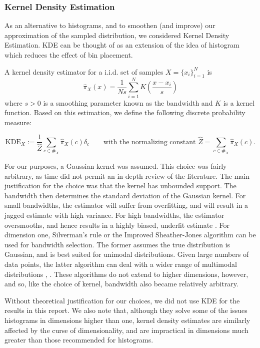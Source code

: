 \subsubsection{Kernel Density Estimation}
As an alternative to histograms, and to smoothen (and improve) our approximation of the sampled distribution, we considered Kernel Density Estimation. KDE can be thought of as an extension of the idea of histogram which reduces the effect of bin placement.

\begin{defn}[KDE]
A kernel density estimator for a i.i.d. set of samples $X = \{x_i\}_{i=1}^N$ is
\[\hat{\pi}_{X} (x) = \frac 1 {Ns} \sum_{i=1}^N K\left( \frac{x - x_i}{s} \right)\]
where $s > 0$ is a smoothing parameter known as the bandwidth and $K$ is a kernel function. Based on this estimation, we define the following discrete probability measure:

\[ \text{KDE}_X := \frac 1 {\hat Z} \sum_{c \in \#_X} \hat{\pi}_X(c) \delta_c \qquad \text{with the normalizing constant } \hat Z = \sum_{c \in \#_X} \hat{\pi}_X(c).\]
\end{defn}

For our purposes, a Gaussian kernel was assumed.  This choice was fairly arbitrary, as time did not permit an in-depth review of the literature.  The main justification for the choice was that the kernel has unbounded support.  The bandwidth then determines the standard deviation of the Gaussian kernel.  For small bandwidths, the estimator will suffer from overfitting, and will result in a jagged estimate with high variance.  For high bandwidths, the estimator oversmooths, and hence results in a highly biased, underfit estimate \cite{kroese2013handbook}.  For dimension one, Silverman's rule or the Improved Sheather-Jones algorithm can be used for bandwidth selection.  The former assumes the true distribution is Gaussian, and is best suited for unimodal distributions.  Given large numbers of data points, the latter algorithm can deal with a wider range of multimodal distributions \cite{botev2010kernel}, \cite{wand1994kernel}.  These algorithms do not extend to higher dimensions, however, and so, like the choice of kernel, bandwidth also became relatively arbitrary.

Without theoretical justification for our choices, we did not use KDE for the results in this report.  We also note that, although they solve some of the issues histograms in dimensions higher than one, kernel density estimates are similarly affected by the curse of dimensionality, and are impractical in dimensions much greater than those recommended for histograms.  

